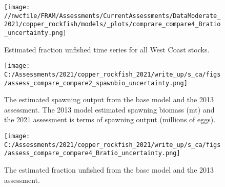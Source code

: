\documentclass[11pt,
  english,
  a4paper,
]{article}
\begin{document}
\tagmcend\tagstructend


\begin{figure}
\centering
\texttt{[image: //nwcfile/FRAM/Assessments/CurrentAssessments/DataModerate\_2021/copper\_rockfish/models/\_plots/comprare\_compare4\_Bratio\_uncertainty.png]}
\caption{Estimated fraction unfished time series for all West Coast stocks.\label{fig:depl-compare}}
\end{figure}

\tagmcend\tagstructend

\clearpage


\begin{figure}
\centering
\texttt{[image: C:/Assessments/2021/copper\_rockfish\_2021/write\_up/s\_ca/figs/assess\_compare\_compare2\_spawnbio\_uncertainty.png]}
\caption{The estimated spawning output from the base model and the 2013 assessment. The 2013 model estimated spawning biomass (mt) and the 2021 assessment is terms of spawning output (millions of eggs).\label{fig:compare-ssb-2013}}
\end{figure}

\tagmcend\tagstructend


\begin{figure}
\centering
\texttt{[image: C:/Assessments/2021/copper\_rockfish\_2021/write\_up/s\_ca/figs/assess\_compare\_compare4\_Bratio\_uncertainty.png]}
\caption{The estimated fraction unfished from the base model and the 2013 assessment.\label{fig:compare-depl-2013}}
\end{figure}

\tagmcend\tagstructend

\newpage

\end{document}
